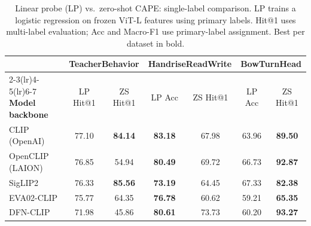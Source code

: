 \documentclass[electronics,article,submit,pdftex,moreauthors]{Definitions/mdpi}
\begin{document}
\begin{table}[H]
\caption{Linear probe (LP) vs.\ zero-shot CAPE: single-label comparison. LP trains a logistic regression on frozen ViT-L features using primary labels. Hit@1 uses multi-label evaluation; Acc and Macro-F1 use primary-label assignment. Best per dataset in bold.}
\label{tab:linear_probe}
\centering
\small
\setlength{\tabcolsep}{3pt}
\begin{tabular}{l cc cc cc}
\toprule
 & \multicolumn{2}{c}{\textbf{TeacherBehavior}} & \multicolumn{2}{c}{\textbf{HandriseReadWrite}} & \multicolumn{2}{c}{\textbf{BowTurnHead}} \\
\cmidrule(lr){2-3}\cmidrule(lr){4-5}\cmidrule(lr){6-7}
\textbf{Model backbone} & LP Hit@1 & ZS Hit@1 & LP Acc & ZS Hit@1 & LP Acc & ZS Hit@1 \\
\midrule
CLIP (OpenAI) & 77.10 & \textbf{84.14} & \textbf{83.18} & 67.98 & 63.96 & \textbf{89.50} \\
OpenCLIP (LAION) & 76.85 & 54.94 & \textbf{80.49} & 69.72 & 66.73 & \textbf{92.87} \\
SigLIP2 & 76.33 & \textbf{85.56} & \textbf{73.19} & 64.45 & 67.33 & \textbf{82.38} \\
EVA02-CLIP & 75.77 & 64.35 & \textbf{76.78} & 60.62 & 59.21 & \textbf{65.35} \\
DFN-CLIP & 71.98 & 45.86 & \textbf{80.61} & 73.73 & 60.20 & \textbf{93.27} \\
\bottomrule
\end{tabular}
\end{table}
\end{document}
